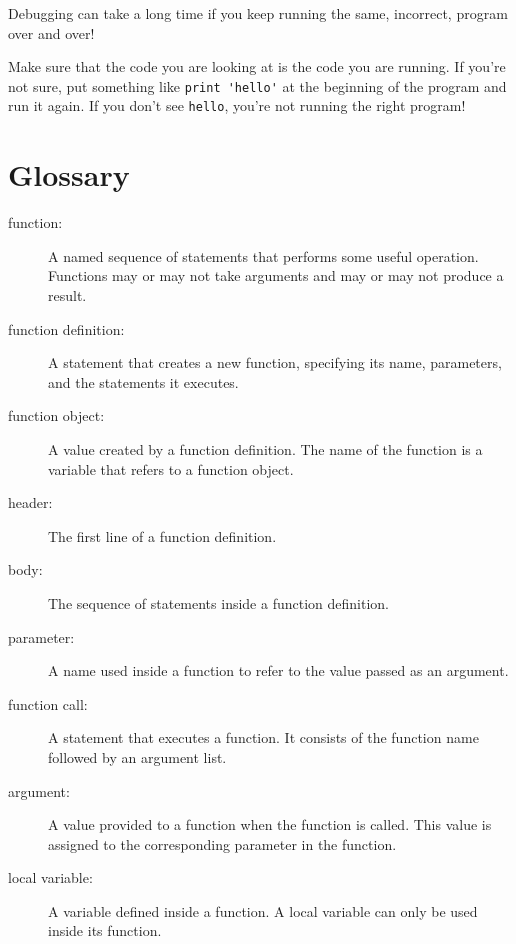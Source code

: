\documentclass[10pt]{book}
\begin{document}
Debugging can take a long time if you keep running the same,
incorrect, program over and over!

Make sure that the code you are looking at is the code you are running.
If you're not sure, put something like \verb"print 'hello'" at the
beginning of the program and run it again.  If you don't see
\verb"hello", you're not running the right program!




\section{Glossary}

\begin{description}

\item[function:] A named sequence of statements that performs some
useful operation.  Functions may or may not take arguments and may or
may not produce a result.

\item[function definition:]  A statement that creates a new function,
specifying its name, parameters, and the statements it executes.

\item[function object:]  A value created by a function definition.
The name of the function is a variable that refers to a function
object.

\item[header:] The first line of a function definition.

\item[body:] The sequence of statements inside a function definition.

\item[parameter:] A name used inside a function to refer to the value
passed as an argument.

\item[function call:] A statement that executes a function. It
consists of the function name followed by an argument list.

\item[argument:]  A value provided to a function when the function is called.
This value is assigned to the corresponding parameter in the function.

\item[local variable:]  A variable defined inside a function.  A local
variable can only be used inside its function.


\end{description}
\end{document}
